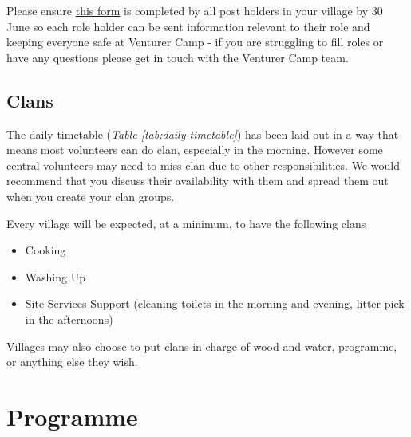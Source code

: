 \documentclass[a4paper, 11pt]{report}
\newcommand{\nl}{\newline}
\begin{document}
Please ensure \href{https://forms.gle/HrV2H4Yyr1tsCpBGA}{this form} is completed by all post holders in your village by 30 June so each role holder can be sent information relevant to their role and keeping everyone safe at Venturer Camp - if you are struggling to fill roles or have any questions please get in touch with the Venturer Camp team. 

\section{Clans}
The daily timetable (\textit{Table \ref*{tab:daily-timetable}}) has been laid out in a way that means most volunteers can do clan, especially in the morning. However some central volunteers may need to miss clan due to other responsibilities. We would recommend that you discuss their availability with them and spread them out when you create your clan groups. \nl

Every village will be expected, at a minimum, to have the following clans
\begin{itemize}
    \item Cooking
    \item Washing Up
    \item Site Services Support (cleaning toilets in the morning and evening, litter pick in the afternoons)   
\end{itemize}
Villages may also choose to put clans in charge of wood and water, programme, or anything else they wish. 


\chapter{Programme}
\end{document}
